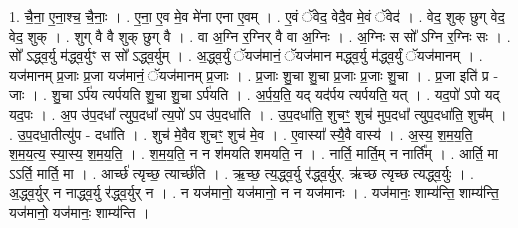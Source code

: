 \documentclass[17pt]{extarticle}
\begin{document}
1. चै॒ना॒ ए॒ना॒श्च॒ चै॒नाः॒ । . ए॒ना॒ ए॒व मे॒व मे॑ना एना ए॒वम् । . ए॒वं ॅवेद॒ वेदै॒व मे॒वं ॅवेद॑ । . वेद॒ शुक् छुग् वेद॒ वेद॒ शुक् । . शुग् वै वै शुक् छुग् वै । . वा अ॒ग्नि र॒ग्निर् वै वा अ॒ग्निः । . अ॒ग्निः स सो᳚ ऽग्नि र॒ग्निः सः । . सो᳚ ऽद्ध्व॒र्यु म॑द्ध्व॒र्युꣳ स सो᳚ ऽद्ध्व॒र्युम् । . अ॒द्ध्व॒र्युं ॅयज॑मानं॒ ॅयज॑मान मद्ध्व॒र्यु म॑द्ध्व॒र्युं ॅयज॑मानम् । . यज॑मानम् प्र॒जाः प्र॒जा यज॑मानं॒ ॅयज॑मानम् प्र॒जाः । . प्र॒जाः शु॒चा शु॒चा प्र॒जाः प्र॒जाः शु॒चा । . प्र॒जा इति॑ प्र - जाः । . शु॒चा ऽर्प॑य त्यर्पयति शु॒चा शु॒चा ऽर्प॑यति । . अ॒र्प॒य॒ति॒ यद् यद॑र्पय त्यर्पयति॒ यत् । . यद॒पो॑ ऽपो यद् यद॒पः । . अ॒प उ॑प॒दधा᳚ त्युप॒दधा᳚ त्य॒पो॑ ऽप उ॑प॒दधा॑ति । . उ॒प॒दधा॑ति॒ शुचꣳ॒॒ शुच॑ मुप॒दधा᳚ त्युप॒दधा॑ति॒ शुच᳚म् । . उ॒प॒दधा॒तीत्यु॑प - दधा॑ति । . शुच॑ मे॒वैव शुचꣳ॒॒ शुच॑ मे॒व । . ए॒वास्या᳚ स्यै॒वै वास्य॑ । . अ॒स्य॒ श॒म॒य॒ति॒ श॒म॒य॒त्य॒ स्या॒स्य॒ श॒म॒य॒ति॒ । . श॒म॒य॒ति॒ न न श॑मयति शमयति॒ न । . नार्ति॒ मार्ति॒म् न नार्ति᳚म् । . आर्ति॒ मा ऽऽर्ति॒ मार्ति॒ मा । . आर्च्छ॑ त्यृच्छ॒ त्यार्च्छ॑ति । . ऋ॒च्छ॒ त्य॒द्ध्व॒र्यु र॑द्ध्व॒र्युर्. ऋ॑च्छ त्यृच्छ त्यद्ध्व॒र्युः । . अ॒द्ध्व॒र्युर् न नाद्ध्व॒र्यु र॑द्ध्व॒र्युर् न । . न यज॑मानो॒ यज॑मानो॒ न न यज॑मानः । . यज॑मानः॒ शाम्य॑न्ति॒ शाम्य॑न्ति॒ यज॑मानो॒ यज॑मानः॒ शाम्य॑न्ति । \newline
\end{document}
